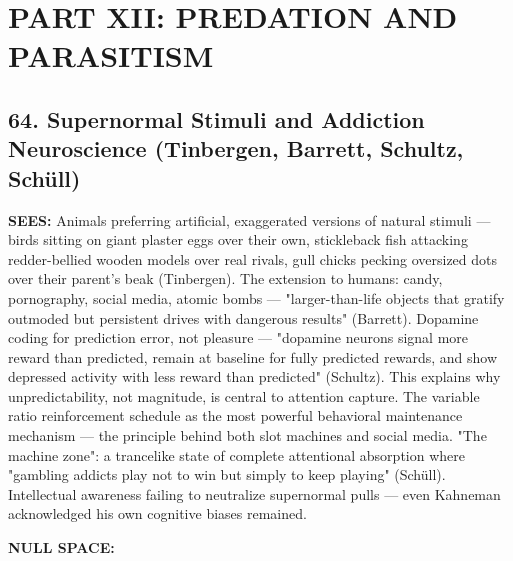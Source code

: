 \section*{PART XII: PREDATION AND PARASITISM}


\subsection*{64. Supernormal Stimuli and Addiction Neuroscience (Tinbergen, Barrett, Schultz, Schüll)}


\textbf{SEES:} Animals preferring artificial, exaggerated versions of natural stimuli — birds sitting on giant plaster eggs over their own, stickleback fish attacking redder-bellied wooden models over real rivals, gull chicks pecking oversized dots over their parent's beak (Tinbergen). The extension to humans: candy, pornography, social media, atomic bombs — "larger-than-life objects that gratify outmoded but persistent drives with dangerous results" (Barrett). Dopamine coding for prediction error, not pleasure — "dopamine neurons signal more reward than predicted, remain at baseline for fully predicted rewards, and show depressed activity with less reward than predicted" (Schultz). This explains why unpredictability, not magnitude, is central to attention capture. The variable ratio reinforcement schedule as the most powerful behavioral maintenance mechanism — the principle behind both slot machines and social media. "The machine zone": a trancelike state of complete attentional absorption where "gambling addicts play not to win but simply to keep playing" (Schüll). Intellectual awareness failing to neutralize supernormal pulls — even Kahneman acknowledged his own cognitive biases remained.


\textbf{NULL SPACE:}


